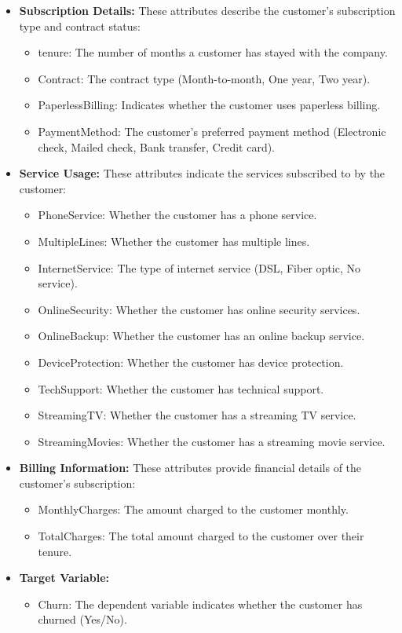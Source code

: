 \begin{itemize}
    \item \textbf{Subscription Details:} These attributes describe the customer's subscription type and contract status:
    \begin{itemize}
        \item tenure: The number of months a customer has stayed with the company.
        \item Contract: The contract type (Month-to-month, One year, Two year).
        \item PaperlessBilling: Indicates whether the customer uses paperless billing.
        \item PaymentMethod: The customer's preferred payment method (Electronic check, Mailed check, Bank transfer, Credit card).
    \end{itemize}
    \item \textbf{Service Usage:} These attributes indicate the services subscribed to by the customer:
    \begin{itemize}
        \item PhoneService: Whether the customer has a phone service.
        \item MultipleLines: Whether the customer has multiple lines.
        \item InternetService: The type of internet service (DSL, Fiber optic, No service).
        \item OnlineSecurity: Whether the customer has online security services.
        \item OnlineBackup: Whether the customer has an online backup service.
        \item DeviceProtection: Whether the customer has device protection.
        \item TechSupport: Whether the customer has technical support.
        \item StreamingTV: Whether the customer has a streaming TV service.
        \item StreamingMovies: Whether the customer has a streaming movie service.
    \end{itemize}
    \item \textbf{Billing Information:} These attributes provide financial details of the customer's subscription:
    \begin{itemize}
        \item MonthlyCharges: The amount charged to the customer monthly.
        \item TotalCharges: The total amount charged to the customer over their tenure.
    \end{itemize}
    \item \textbf{Target Variable:}
    \begin{itemize}
        \item Churn: The dependent variable indicates whether the customer has churned (Yes/No).
    \end{itemize}
\end{itemize}
